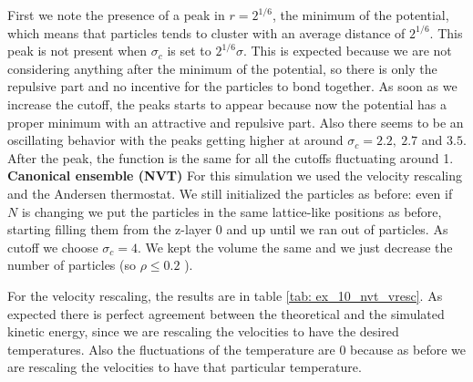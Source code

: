 \documentclass[../main.tex]{subfiles}
\begin{document}
First we note the presence of a peak in $r=2^{1/6}$, the minimum of the potential, which means that particles tends to cluster with an average distance of $2^{1/6}$. This peak is not present when $\sigma_c$ is set to $2^{1/6}\sigma$. This is expected because we are not considering anything after the minimum of the potential, so there is only the repulsive part and no incentive for the particles to bond together. As soon as we increase the cutoff, the peaks starts to appear because now the potential has a proper minimum with an attractive and repulsive part. Also there seems to be an oscillating behavior with the peaks getting higher at around $\sigma_c = 2.2,\ 2.7$ and $3.5$. After the peak, the function is the same for all the cutoffs fluctuating around 1.
\newline
\newline
\textbf{Canonical ensemble (NVT)} For this simulation we used the velocity rescaling and the Andersen thermostat. We still initialized the particles as before: even if $N$ is changing we put the particles in the same lattice-like positions as before, starting filling them from the z-layer 0 and up until we ran out of particles. As cutoff we choose $\sigma_c=4$. We kept the volume the same and we just decrease the number of particles (so $\rho \le0.2$ ). 

\noindent For the velocity rescaling, the results are in table \ref{tab: ex_10_nvt_vresc}. As expected there is perfect agreement between the theoretical and the simulated kinetic energy, since we are rescaling the velocities to have the desired temperatures. Also the fluctuations of the temperature are 0 because as before we are rescaling the velocities to have that particular temperature.
\end{document}
